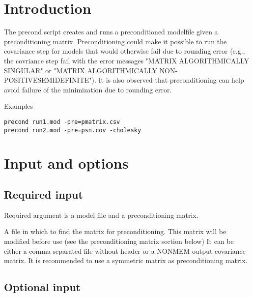 
\usepackage{color}
\usepackage{amsmath}



\maketitle

\section{Introduction}
The precond script creates and runs a preconditioned modelfile given a preconditioning matrix.
Preconditioning could make it possible to run the covariance step for models that would otherwise fail due to rounding error (e.g., the covriance step fail with the error messages "MATRIX ALGORITHMICALLY SINGULAR" or "MATRIX ALGORITHMICALLY NON-POSITIVESEMIDEFINITE"). It is also observed that preconditioning can help avoid failure of the minimization due to rounding error.


Examples
\begin{verbatim}
precond run1.mod -pre=pmatrix.csv
precond run2.mod -pre=psn.cov -cholesky
\end{verbatim}

\section{Input and options}

\subsection{Required input}
Required argument is a model file and a preconditioning matrix.

\begin{optionlist}

A file in which to find the matrix for preconditioning. This matrix will be modified before use (see the preconditioning matrix section below) It can be either a comma separated file without header or a NONMEM output covariance matrix. It is recommended to use a symmetric matrix as preconditioning matrix.
\nextopt
\end{optionlist}

\subsection{Optional input}

